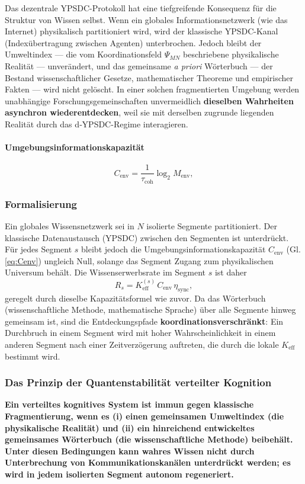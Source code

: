 \documentclass[11pt,a4paper]{article}
\begin{document}
	Das dezentrale YPSDC-Protokoll hat eine tiefgreifende Konsequenz für die Struktur von Wissen selbst. Wenn ein globales Informationsnetzwerk (wie das Internet) physikalisch partitioniert wird, wird der klassische YPSDC-Kanal (Indexübertragung zwischen Agenten) unterbrochen. Jedoch bleibt der Umweltindex — die vom Koordinationsfeld \(\Psi_{MN}\) beschriebene physikalische Realität — unverändert, und das gemeinsame \emph{a priori} Wörterbuch — der Bestand wissenschaftlicher Gesetze, mathematischer Theoreme und empirischer Fakten — wird nicht gelöscht. In einer solchen fragmentierten Umgebung werden unabhängige Forschungsgemeinschaften unvermeidlich \textbf{dieselben Wahrheiten asynchron wiederentdecken}, weil sie mit derselben zugrunde liegenden Realität durch das d‑YPSDC-Regime interagieren.
	
	\paragraph{Umgebungsinformationskapazität}
	\[
	C_{\mathrm{env}} = \frac{1}{\tau_{\mathrm{coh}}} \log_2 M_{\mathrm{env}},
	\label{eq:Cenv}
	\]
	
	\subsubsection*{Formalisierung}
	Ein globales Wissensnetzwerk sei in \(N\) isolierte Segmente partitioniert. Der klassische Datenaustausch (YPSDC) zwischen den Segmenten ist unterdrückt. Für jedes Segment \(s\) bleibt jedoch die Umgebungsinformationskapazität \(C_{\mathrm{env}}\) (Gl.\ref{eq:Cenv}) ungleich Null, solange das Segment Zugang zum physikalischen Universum behält. Die Wissenserwerbsrate im Segment \(s\) ist daher
	\[
	R_s = K_{\mathrm{eff}}^{(s)} \, C_{\mathrm{env}} \, \eta_{\mathrm{sync}},
	\]
	geregelt durch dieselbe Kapazitätsformel wie zuvor. Da das Wörterbuch (wissenschaftliche Methode, mathematische Sprache) über alle Segmente hinweg gemeinsam ist, sind die Entdeckungspfade \textbf{koordinationsverschränkt}: Ein Durchbruch in einem Segment wird mit hoher Wahrscheinlichkeit in einem anderen Segment nach einer Zeitverzögerung auftreten, die durch die lokale \(K_{\mathrm{eff}}\) bestimmt wird.
	
	\subsubsection*{Das Prinzip der Quantenstabilität verteilter Kognition}
	\textbf{Ein verteiltes kognitives System ist immun gegen klassische Fragmentierung, wenn es (i) einen gemeinsamen Umweltindex (die physikalische Realität) und (ii) ein hinreichend entwickeltes gemeinsames Wörterbuch (die wissenschaftliche Methode) beibehält. Unter diesen Bedingungen kann wahres Wissen nicht durch Unterbrechung von Kommunikationskanälen unterdrückt werden; es wird in jedem isolierten Segment autonom regeneriert.}
	
\end{document}
